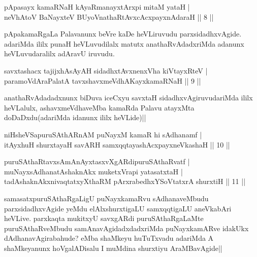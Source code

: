 
\begin{shl}
pApasayx kamaRNaH kAyaRmanayxtArxpi mitaM yataH |\\
neVhAtoV BaNayxteV  BUyoV\s nathaRtAvxcAcxpayxnAdaraH \hfill || 8 ||
\end{shl}

\begin{artha}
pApakamaRgaLa Palavanunx beVre kaDe heVLiruvudu parxsidadhxvAgide. adariMda ililx punaH heVLuvudilalx matutx anathaRvAdadxriMda adanunx heVLuvudaralilx adAravU iruvudu.
\end{artha}

\begin{shl}
savxtashacx tajijxhAsAyAH sidadhxtAvxnenxVha kiVtayxRteV |\\
paramoVdAraPalatA tavxshavxmeVdhAKayxkamaRNaH \hfill || 9 ||
\end{shl}

\begin{artha}
anathaRvAdadadxnunx biDuva iceCxyu savxtaH sidadhxvAgiruvudariMda ililx heVLalulx, ashavxmeVdhaveMba kamaRda Palavu atayxMta doDaDxdu(adariMda idanunx ililx heVLide)||
\end{artha}


\begin{shl}
niHsheVSapuruSAthARnAM puNayxM kamaR hi sAdhanamf |\\
itAyxhuH shurxtayaH savARH samxqqtayashAcxpayxneVkashaH \hfill || 10 ||
\end{shl}

\begin{shl}
puruSAthaRtavxsAmAnAyxtasxvXgARdipuruSAthaRvatf |\\
muNayxsAdhanatAshaknAkx muketxVrapi yatasatxtaH |\\
tadAshaknAkxnivaqtatxyXthaRM pArxrabedhxYSoVtatxrA shurxtiH \hfill || 11 ||
\end{shl}

\begin{artha}
samasatxpuruSAthaRgaLigU puNayxkamaRvu sAdhanaveMbudu parxsidadhxvAgide yeMdu elAlxshurxtigaLU samxqqtigaLU aneVkabAri heVLive. parxkaqta mukitxyU savxgARdi puruSAthaRgaLaMte puruSAthaRveMbudu samAnavAgidadxdadxriMda puNayxkamARve idakUkx dAdhanavAgirabahude? eMba shaMkeyu huTuTxvadu adariMda A shaMkeyanunx hoVgalADisalu I muMdina shurxtiyu AraMBavAgide||
\end{artha}

